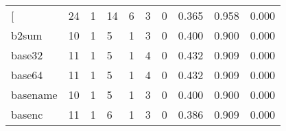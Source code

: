 \begin{longtable}{lp{2.0cm}p{2.0cm}p{2.0cm}p{2.0cm}p{2.0cm}p{2.0cm}p{2.0cm}p{2.0cm}p{2.0cm}}
\bottomrule
\endlastfoot
{[}         &                     24 &                                             1 &                                           14 &                                           6 &                                            3 &                                          0 &                                0.365 &                                  0.958 &                                0.000 \\
b2sum     &                     10 &                                             1 &                                            5 &                                           1 &                                            3 &                                          0 &                                0.400 &                                  0.900 &                                0.000 \\
base32    &                     11 &                                             1 &                                            5 &                                           1 &                                            4 &                                          0 &                                0.432 &                                  0.909 &                                0.000 \\
base64    &                     11 &                                             1 &                                            5 &                                           1 &                                            4 &                                          0 &                                0.432 &                                  0.909 &                                0.000 \\
basename  &                     10 &                                             1 &                                            5 &                                           1 &                                            3 &                                          0 &                                0.400 &                                  0.900 &                                0.000 \\
basenc    &                     11 &                                             1 &                                            6 &                                           1 &                                            3 &                                          0 &                                0.386 &                                  0.909 &                                0.000 \\

\end{longtable}
